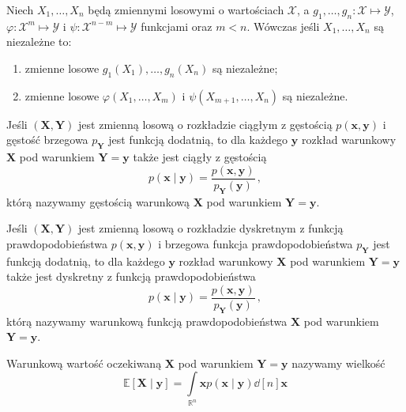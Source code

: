\documentclass{myclass}
\numberwithin{equation}{subsection}
\begin{document}
\begin{theorem}
Niech \(X_1,\ldots,X_n\) będą zmiennymi losowymi o wartościach \(\mathcal{X}\), a \(g_1,\ldots,g_n:
\mathcal{X} \mapsto \mathcal{Y}\), \(\varphi: \mathcal{X}^m \mapsto \mathcal{Y}\) i \(\psi:
\mathcal{X}^{n-m}\mapsto\mathcal{Y}\) funkcjami oraz \(m < n\). Wówczas jeśli \(X_1,\ldots,X_n\) są
niezależne to:
\begin{enumerate}
    \item zmienne losowe \(g_1(X_1),\ldots,g_n(X_n)\) są niezależne;
    \item zmienne losowe \(\varphi(X_1,\ldots,X_m)\) i \(\psi(X_{m+1},\ldots,X_n)\) są niezależne.
\end{enumerate}
\end{theorem}

Jeśli \((\bm{X}, \bm{Y})\) jest zmienną losową o rozkładzie ciągłym z gęstością \(p(\bm{x},
\bm{y})\) i gęstość brzegowa \(p_{\bm{Y}}\) jest funkcją dodatnią, to dla każdego \(\bm{y}\) rozkład
warunkowy \(\bm{X}\) pod warunkiem \(\bm{Y} = \bm{y}\) także jest ciągły z gęstością
\begin{equation}
    p(\bm{x} \mid \bm{y}) = \frac{p(\bm{x}, \bm{y})}{p_{\bm{Y}}(\bm{y})}\,,
\end{equation}
którą nazywamy gęstością warunkową \(\bm{X}\) pod warunkiem \(\bm{Y} = \bm{y}\).

Jeśli \((\bm{X}, \bm{Y})\) jest zmienną losową o rozkładzie dyskretnym z funkcją prawdopodobieństwa
\(p(\bm{x}, \bm{y})\) i brzegowa funkcja prawdopodobieństwa \(p_{\bm{Y}}\) jest funkcją dodatnią, to
dla każdego \(\bm{y}\) rozkład warunkowy \(\bm{X}\) pod warunkiem \(\bm{Y} = \bm{y}\) także jest
dyskretny z funkcją prawdopodobieństwa
\begin{equation}
    p(\bm{x} \mid \bm{y}) = \frac{p(\bm{x}, \bm{y})}{p_{\bm{Y}}(\bm{y})}\,,
\end{equation}
którą nazywamy warunkową funkcją prawdopodobieństwa \(\bm{X}\) pod warunkiem \(\bm{Y} = \bm{y}\).

\begin{definition}
Warunkową wartość oczekiwaną \(\bm{X}\) pod warunkiem \(\bm{Y} = \bm{y}\) nazywamy wielkość
\begin{equation*}
    \mathbb{E}[\bm{X} \mid \bm{y}] = \int\limits_{\mathbb{R}^n} \bm{x} p(\bm{x} \mid \bm{y}) \dd[n]{\bm{x}}
\end{equation*}
\end{definition}
\end{document}

